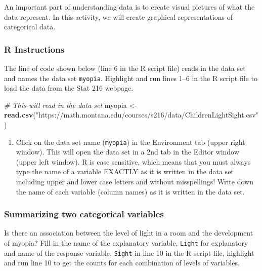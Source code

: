 \documentclass[
]{report}
\newenvironment{Shaded}{\begin{snugshade}}{\end{snugshade}}
\newcommand{\CommentTok}[1]{\textcolor[rgb]{0.56,0.35,0.01}{\textit{#1}}}
\newcommand{\FunctionTok}[1]{\textcolor[rgb]{0.13,0.29,0.53}{\textbf{#1}}}
\newcommand{\NormalTok}[1]{#1}
\newcommand{\OtherTok}[1]{\textcolor[rgb]{0.56,0.35,0.01}{#1}}
\newcommand{\StringTok}[1]{\textcolor[rgb]{0.31,0.60,0.02}{#1}}
\providecommand{\tightlist}{%
  \setlength{\itemsep}{0pt}\setlength{\parskip}{0pt}}
\begin{document}
An important part of understanding data is to create visual pictures of what the data represent. In this activity, we will create graphical representations of categorical data.

\subsubsection*{R Instructions}\label{r-instructions-7}

The line of code shown below (line 6 in the R script file) reads in the data set and names the data set \texttt{myopia}. Highlight and run lines 1--6 in the R script file to load the data from the Stat 216 webpage.

\begin{Shaded}
\begin{Highlighting}[]
\CommentTok{\# This will read in the data set}
\NormalTok{myopia }\OtherTok{\textless{}{-}} \FunctionTok{read.csv}\NormalTok{(}\StringTok{"https://math.montana.edu/courses/s216/data/ChildrenLightSight.csv"}\NormalTok{) }
\end{Highlighting}
\end{Shaded}

\begin{enumerate}
\def\labelenumi{\arabic{enumi}.}
\tightlist
\item
  Click on the data set name (\texttt{myopia}) in the Environment tab (upper right window). This will open the data set in a 2nd tab in the Editor window (upper left window). R is case sensitive, which means that you must always type the name of a variable EXACTLY as it is written in the data set including upper and lower case letters and without misspellings! Write down the name of each variable (column names) as it is written in the data set.
\end{enumerate}

\vspace{0.3in}

\subsubsection*{Summarizing two categorical variables}\label{summarizing-two-categorical-variables}

Is there an association between the level of light in a room and the development of myopia? Fill in the name of the explanatory variable, \texttt{Light} for explanatory and name of the response variable, \texttt{Sight} in line 10 in the R script file, highlight and run line 10 to get the counts for each combination of levels of variables.
\end{document}
